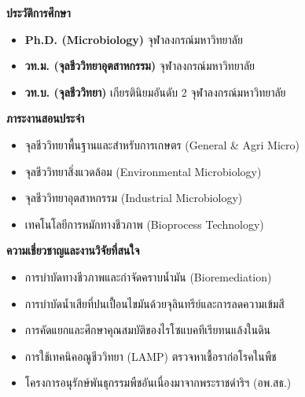 \noindent
\begin{minipage}[t]{0.48\textwidth}%
    {\fontsize{12}{14}\selectfont\bfseries\color{agriGreen} ประวัติการศึกษา}\par\vspace{2pt}
    \small
    \begin{itemize}\setlength{\itemsep}{1pt}\setlength{\parsep}{0pt}\setlength{\topsep}{1pt}\setlength{\partopsep}{0pt}\setlength{\leftmargin}{10pt}
        \item \textbf{Ph.D. (Microbiology)} จุฬาลงกรณ์มหาวิทยาลัย
        \item \textbf{วท.ม. (จุลชีววิทยาอุตสาหกรรม)} จุฬาลงกรณ์มหาวิทยาลัย
        \item \textbf{วท.บ. (จุลชีววิทยา)} เกียรตินิยมอันดับ 2 จุฬาลงกรณ์มหาวิทยาลัย
    \end{itemize}

    \vspace{0.2cm}
    {\fontsize{12}{14}\selectfont\bfseries\color{agriGreen} ภาระงานสอนประจำ}\par\vspace{2pt}
    \small
    \begin{itemize}\setlength{\itemsep}{1pt}\setlength{\parsep}{0pt}\setlength{\topsep}{1pt}\setlength{\partopsep}{0pt}\setlength{\leftmargin}{10pt}
        \item จุลชีววิทยาพื้นฐานและสำหรับการเกษตร (General \& Agri Micro)
        \item จุลชีววิทยาสิ่งแวดล้อม (Environmental Microbiology)
        \item จุลชีววิทยาอุตสาหกรรม (Industrial Microbiology)
        \item เทคโนโลยีการหมักทางชีวภาพ (Bioprocess Technology)
    \end{itemize}
\end{minipage}\hfill
\begin{minipage}[t]{0.48\textwidth}%
    {\fontsize{12}{14}\selectfont\bfseries\color{agriGreen} ความเชี่ยวชาญและงานวิจัยที่สนใจ}\par\vspace{2pt}
    \small
    \begin{itemize}\setlength{\itemsep}{1.5pt}\setlength{\parsep}{0pt}\setlength{\topsep}{1pt}\setlength{\partopsep}{0pt}\setlength{\leftmargin}{10pt}
        \item การบำบัดทางชีวภาพและกำจัดคราบน้ำมัน (Bioremediation)
        \item การบำบัดน้ำเสียที่ปนเปื้อนไขมันด้วยจุลินทรีย์และการลดความเข้มสี
        \item การคัดแยกและศึกษาคุณสมบัติของไรโซแบคทีเรียทนแล้งในดิน
        \item การใช้เทคนิคอณูชีววิทยา (LAMP) ตรวจหาเชื้อราก่อโรคในพืช
        \item โครงการอนุรักษ์พันธุกรรมพืชอันเนื่องมาจากพระราชดำริฯ (อพ.สธ.)
    \end{itemize}
\end{minipage}
